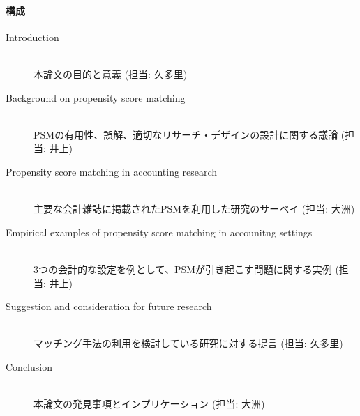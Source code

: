 \paragraph{構成}
\begin{description}
 \item[Introduction] \mbox{}\\
            本論文の目的と意義 (担当: 久多里)
 \item[Background on propensity score matching] \mbox{}\\
            PSMの有用性、誤解、適切なリサーチ・デザインの設計に関する議論 (担当: 井上)
 \item[Propensity score matching in accounting research] \mbox{}\\
            主要な会計雑誌に掲載されたPSMを利用した研究のサーベイ (担当: 大洲)
 \item[Empirical examples of propensity score matching in accounitng settings] \mbox{}\\
            3つの会計的な設定を例として、PSMが引き起こす問題に関する実例 (担当: 井上)
 \item[Suggestion and consideration for future research] \mbox{}\\
            マッチング手法の利用を検討している研究に対する提言  (担当: 久多里)
 \item[Conclusion] \mbox{}\\
            本論文の発見事項とインプリケーション  (担当: 大洲)
\end{description}




